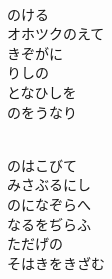 \documentclass[10pt,b5j]{tarticle} %
\begin{document}
\vspace{1.5em} %
\newcommand{\linespace}{0.5em} %
\newcommand{\blocksize}{0.5\hsize} %
\newcommand{\itemmargin}{3em} %
\begin{enumerate} %
    \setlength{\itemindent}{\itemmargin} %
    \begin{minipage}[c]{\blocksize}
    
        \vspace{\linespace}
        \item~\\
        のける\\
        オホツクのえて\\
        きぞがに\\
        りしの\\
        となひしを\\
        のをうなり
        
    \end{minipage}
    \begin{minipage}[c]{\blocksize}
        
        \vspace{\linespace}
        \item~\\
        のはこびて\\
        みさぶるにし\\
        のになぞらへ\\
        なるをぢらふ\\
        ただげの\\
        そはきをきざむ
        
    \end{minipage}
    \begin{minipage}[c]{\blocksize}
        

\end{minipage}
\end{enumerate}
\end{document}

